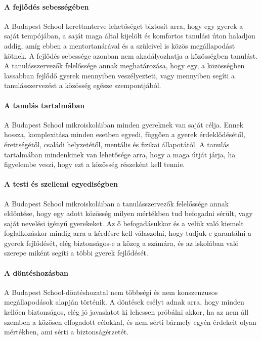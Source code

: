 \paragraph{A fejlődés sebességében}

  A Budapest School kerettanterve lehetőséget biztosít arra, hogy egy
  gyerek a saját tempójában, a saját maga által kijelölt és komfortos
  tanulási úton haladjon addig, amíg ebben a mentortanárával és a
  szüleivel is közös megállapodást kötnek. A fejlődés sebessége azonban
  nem akadályozhatja a közösségben tanulást. A tanulásszervezők
  felelőssége annak meghatározása, hogy egy, a közösségben lassabban
  fejlődő gyerek mennyiben veszélyezteti, vagy mennyiben segíti a
  tanulásszervezést a közösség egésze szempontjából.


\paragraph{A tanulás tartalmában}


  A Budapest School mikroiskoláiban minden gyereknek van saját célja.
  Ennek hossza, komplexitása minden esetben egyedi, függően a gyerek
  érdeklődésétől, érettségétől, családi helyzetétől, mentális és fizikai
  állapotától. A tanulás tartalmában mindenkinek van lehetősége arra,
  hogy a maga útját járja, ha figyelembe veszi, hogy ezt a közösség
  részeként kell tennie.


\paragraph{A testi és szellemi egyediségben}

  A Budapest School mikroiskoláiban a tanulásszervezők felelőssége annak
  eldöntése, hogy egy adott közösség milyen mértékben tud befogadni
  sérült, vagy saját nevelési igényű gyerekeket. Az ő befogadásukkor és
  a velük való kiemelt foglalkozáskor mindig arra a kérdésre kell
  válaszolni, hogy tudjuk-e garantálni a gyerek fejlődését, elég
  biztonsá\-gos-e a közeg a számára, és az iskolában való szerepe miként
  segíti a többi gyerek fejlődését.


\paragraph{A döntéshozásban}

A Budapest School-döntéshozatal nem többségi és\linebreak
nem konszenzusos
  megállapodások alapján történik. A döntések esélyt adnak arra, hogy
  minden kellően biztonságos, elég jó javaslatot ki lehessen próbálni
  akkor, ha az nem áll szemben a közösen elfogadott célokkal, és nem
  sérti  bármely egyén érdekeit olyan mértékben, ami sérti a
  biztonságérzetét.

